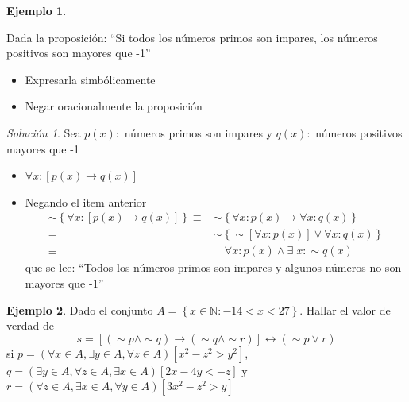 \documentclass[
  16pt,
]{krantz}
\providecommand{\tightlist}{%
  \setlength{\itemsep}{0pt}\setlength{\parskip}{0pt}}
\theoremstyle{definition}
\theoremstyle{definition}
\newtheorem{example}{Ejemplo}[chapter]
\theoremstyle{definition}
\theoremstyle{definition}
\theoremstyle{remark}
\newtheorem*{solution}{Solución}
\begin{document}
\begin{example}
\protect\hypertarget{exm:wwwwwwww}{}\label{exm:wwwwwwww}

Dada la proposición: ``Si todos los números primos son impa­res, los números positivos son mayores que -1''

\begin{itemize}
\tightlist
\item
  Expresarla simbólicamente
\item
  Negar oracionalmente la proposición
\end{itemize}

\end{example}

\begin{solution}

Sea \(p(x):\) números primos son impares y \(q(x):\) números positivos mayores que -1

\begin{itemize}
\item
  \(\forall x:[p(x)\rightarrow q(x)]\)
\item
  Negando el item anterior
  \[
  \begin{aligned}
  \sim\left\{\forall x:[p(x)\rightarrow q(x)]\right\}
  \equiv& \sim\left\{\forall x:p(x)\rightarrow \forall x:q(x)\right\}\\
  =&\sim\left\{\sim[\forall x:p(x)]\vee \forall x:q(x)\right\}\\
  \equiv&\quad\forall x:p(x)\wedge \exists\; x:\sim q(x)
  \end{aligned}
  \]
  que se lee: ``Todos los números primos son impares y algunos números no son mayores que -1''
\end{itemize}

\end{solution}

\begin{example}
\protect\hypertarget{exm:wwwwwwwu}{}\label{exm:wwwwwwwu}Dado el conjunto \(A=\left\{x\in\mathbb{N}:-14<x<27\right\}\). Hallar el valor de verdad de
\[
s=[(\sim p\wedge \sim q)\rightarrow(\sim q\wedge \sim r)]\leftrightarrow(\sim p\vee r)
\]
si
\(p=(\forall x\in A, \exists y\in A, \forall z\in A)[x^2-z^2>y^2]\), \(q=(\exists y\in A, \forall z\in A, \exists x \in A)[2x-4y<-z]\) y \(r=(\forall z\in A, \exists x\in A, \forall y \in A)[3x^2-z^2>y]\)
\end{example}
\end{document}
